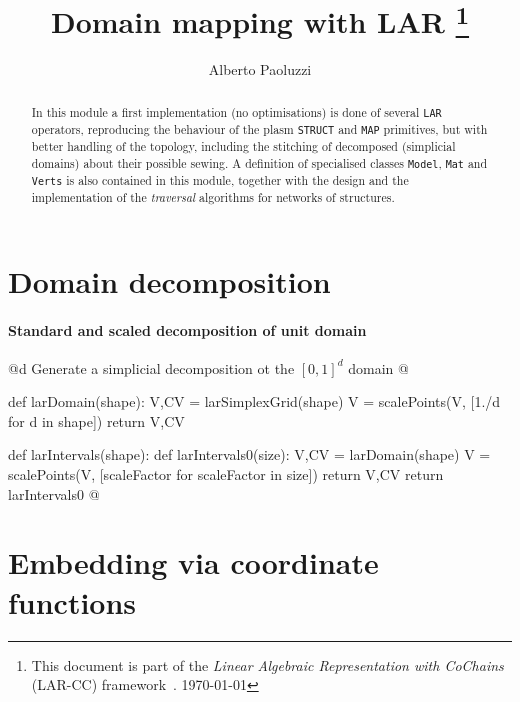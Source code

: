 \documentclass[11pt,oneside]{article}	%
\title{Domain mapping with LAR
\footnote{This document is part of the \emph{Linear Algebraic Representation with CoChains} (LAR-CC) framework~\cite{cclar-proj:2013:00}. \today}
}
\author{Alberto Paoluzzi}
\begin{document}
\maketitle
\nonstopmode

\begin{abstract}
In this module a first implementation (no optimisations) is done of several \texttt{LAR} operators, reproducing the behaviour of the plasm  \texttt{STRUCT} and \texttt{MAP} primitives, but with better handling of the topology, including the stitching of decomposed (simplicial domains) about their possible sewing. A definition of specialised classes \texttt{Model}, \texttt{Mat} and \texttt{Verts} is also contained in this module, together with the design and the implementation of the \emph{traversal} algorithms for networks of structures.
\end{abstract}

\tableofcontents

\section{Domain decomposition}

\paragraph{Standard and scaled decomposition of unit domain}

@d Generate a simplicial decomposition ot the $[0,1]^d$ domain
@{def larDomain(shape):
	V,CV = larSimplexGrid(shape)
	V = scalePoints(V, [1./d for d in shape])
	return V,CV

def larIntervals(shape):
	def larIntervals0(size):
		V,CV = larDomain(shape)
		V = scalePoints(V, [scaleFactor for scaleFactor in size])
		return V,CV
	return larIntervals0
@}

\section{Embedding via coordinate functions}
\end{document}
